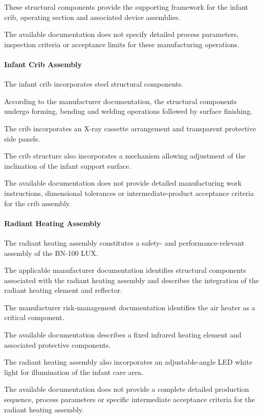 These structural components provide the supporting framework for the
infant crib, operating section and associated device assemblies.

The available documentation does not specify detailed process
parameters, inspection criteria or acceptance limits for these
manufacturing operations.

\paragraph{Infant Crib Assembly}

The infant crib incorporates steel structural components.

According to the manufacturer documentation, the structural
components undergo forming, bending and welding operations followed
by surface finishing.

The crib incorporates an X-ray cassette arrangement and transparent
protective side panels.

The crib structure also incorporates a mechanism allowing adjustment
of the inclination of the infant support surface.

The available documentation does not provide detailed manufacturing
work instructions, dimensional tolerances or intermediate-product
acceptance criteria for the crib assembly.

\paragraph{Radiant Heating Assembly}

The radiant heating assembly constitutes a safety- and
performance-relevant assembly of the BN-100 LUX.

The applicable manufacturer documentation identifies structural
components associated with the radiant heating assembly and describes
the integration of the radiant heating element and reflector.

The manufacturer risk-management documentation identifies the air
heater as a critical component.

The available documentation describes a fixed infrared heating
element and associated protective components.

The radiant heating assembly also incorporates an adjustable-angle
LED white light for illumination of the infant care area.

The available documentation does not provide a complete detailed
production sequence, process parameters or specific intermediate
acceptance criteria for the radiant heating assembly.


